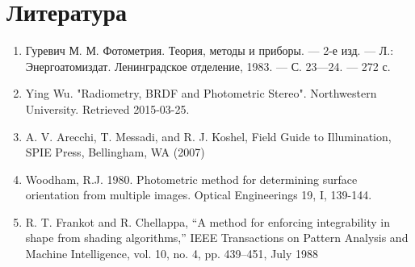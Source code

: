 \documentclass[12pt]{article}
\begin{document}


\newpage
\tableofcontents

\newpage



\newpage



\newpage



\newpage



\newpage

\section{Литература}
\begin{enumerate}
  \item Гуревич М. М. Фотометрия. Теория, методы и приборы. — 2-е изд. — Л.: Энергоатомиздат. Ленинградское отделение, 1983. — С. 23—24. — 272 с.
  \item Ying Wu. "Radiometry, BRDF and Photometric Stereo". Northwestern University. Retrieved 2015-03-25.
  \item A. V. Arecchi, T. Messadi, and R. J. Koshel, Field Guide to Illumination, SPIE Press, Bellingham, WA (2007)
  \item Woodham, R.J. 1980. Photometric method for determining surface orientation from multiple images. Optical Engineerings 19, I, 139-144.
  \item R. T. Frankot and R. Chellappa, “A method for enforcing integrability in shape from shading algorithms,” IEEE Transactions on Pattern Analysis and Machine Intelligence, vol. 10, no. 4, pp. 439–451, July 1988
\end{enumerate}
\end{document}
